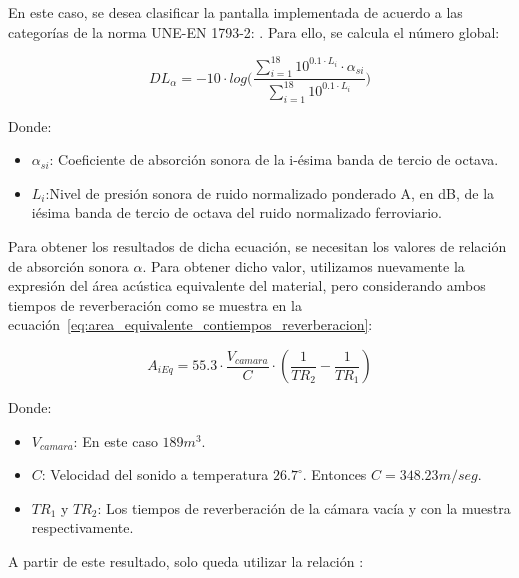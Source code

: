 \par En este caso, se desea clasificar la pantalla implementada de acuerdo a las categorías de la norma UNE-EN 1793-2: . Para ello, se calcula el número global:

\begin{equation}
        DL_\alpha = -10\cdot log \big( \frac{\sum_{i=1}^{18} 10^{0.1 \cdot L_i} \cdot \alpha_{si} }{\sum^{18}_{i=1} 10^{0.1 \cdot L_i} }\big)
    \label{eq:DL_a}
\end{equation}

\par Donde:
\begin{itemize}
    \item $\alpha_{si}$: Coeficiente de absorción sonora de la i-ésima banda de tercio de octava.
    \item $L_i$:Nivel de presión sonora de ruido normalizado ponderado A, en dB, de la iésima banda de tercio de octava del ruido normalizado ferroviario.
\end{itemize}

\par Para obtener los resultados de dicha ecuación, se necesitan los valores de relación de absorción sonora $\alpha$. Para obtener dicho valor, utilizamos nuevamente la expresión del área acústica equivalente del material, pero considerando ambos tiempos de reverberación como se muestra en la ecuación~\eqref{eq:area_equivalente_contiempos_reverberacion}:

\begin{equation}
    A_{iEq} = 55.3 \cdot \frac{V_{camara}}{C} \cdot (\frac{1}{TR_2} - \frac{1}{TR_1})
    \label{eq:area_equivalente_contiempos_reverberacion}
\end{equation}

\par Donde:
\begin{itemize}
    \item $V_{camara}$: En este caso $189m^3$.
    \item $C$: Velocidad del sonido a temperatura $26.7^\circ$. Entonces $C= 348.23 m/seg$.
    \item $TR_1$ y $TR_2$: Los tiempos de reverberación de la cámara vacía y con la muestra respectivamente.
\end{itemize}

\par A partir de este resultado, solo queda utilizar la relación :

